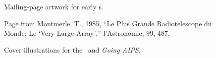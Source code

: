 \begin{figure}
\if\doFig\figyes
   \centerline{\hss{}\hss}
\else
    \vskip 8.0in
\fi
\caption{Mailing-page artwork for early \Aipsletter s.}
\label{fig:Aipsletter}
\end{figure}
\begin{figure}
\if\doFig\figyes
   \centerline{\hss{}\hss}
\else
    \vskip 8.0in
\fi
\caption{Page from Montmerle, T., 1985, ``Le Plus Grande
     Radiotelescope du Monde: Le `Very Large Array','' l'Astronomie,
     99, 487.}
\label{fig:Cookbook}
\end{figure}
\begin{figure}
\if\doFig\figyes
   \centerline{\hss{}\hss}
\else
    \vskip 8.0in
\fi
\caption{Cover illustrations for the \Cookbook\ and {\it Going AIPS}.}
\label{fig:Goingaips}
\end{figure}

